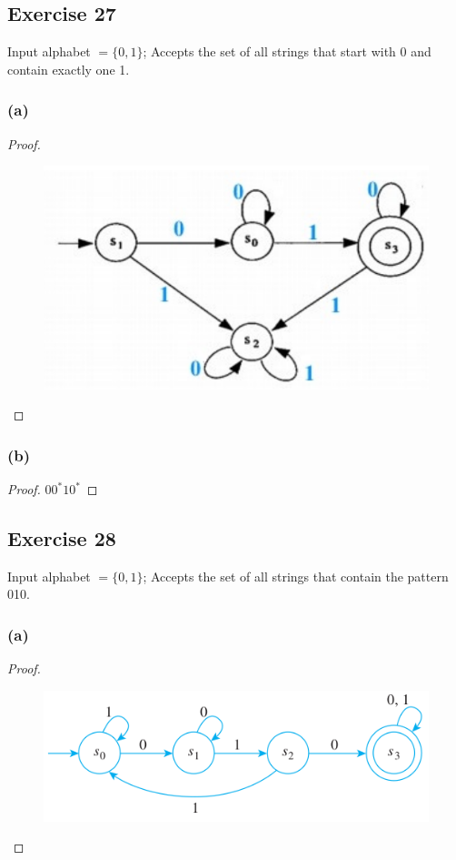 \documentclass[14pt]{extarticle}
\begin{document}
\subsection{Exercise 27}
Input alphabet \(= \{0, 1\}\); Accepts the set of all strings that start with 0 and contain exactly one 1.

\subsubsection{(a)}
\begin{proof}
    \begin{figure}[ht!]
        \centering
        \includegraphics[scale=0.4]{../images/12.2.27.a.png}
    \end{figure}
\end{proof}

\subsubsection{(b)}
\begin{proof}
    \(00^*10^*\)
\end{proof}

\subsection{Exercise 28}
Input alphabet \(= \{0, 1\}\); Accepts the set of all strings that contain the pattern 010.

\subsubsection{(a)}
\begin{proof}
    \begin{figure}[ht!]
        \centering
        \includegraphics[scale=0.5]{../images/12.2.28.a.png}
    \end{figure}
\end{proof}
\end{document}
